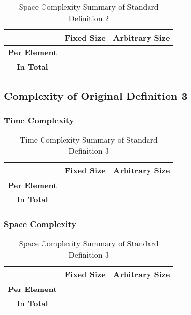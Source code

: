 \documentclass[conference]{IEEEtran}
\begin{document}
\begin{table}[H]
    \centering
    \caption{Space Complexity Summary of Standard Definition 2}
    \begin{tabular}{|c|c|c|}
        \hline
        & \textbf{Fixed Size} & \textbf{Arbitrary Size} \\
        \hline
        \textbf{Per Element} &  &  \\
        \hline
        \textbf{In Total} &  &  \\
        \hline
    \end{tabular}
    \label{tab:space_p2_d02}
\end{table}

\subsection{Complexity of Original Definition 3}
\label{ca:p2_d03}

\subsubsection{Time Complexity}

\begin{table}[H]
    \centering
    \caption{Time Complexity Summary of Standard Definition 3}
    \begin{tabular}{|c|c|c|}
        \hline
        & \textbf{Fixed Size} & \textbf{Arbitrary Size} \\
        \hline
        \textbf{Per Element} &  &  \\
        \hline
        \textbf{In Total} &  &  \\
        \hline
    \end{tabular}
    \label{tab:time_p2_d03}
\end{table}

\subsubsection{Space Complexity}

\begin{table}[H]
    \centering
    \caption{Space Complexity Summary of Standard Definition 3}
    \begin{tabular}{|c|c|c|}
        \hline
        & \textbf{Fixed Size} & \textbf{Arbitrary Size} \\
        \hline
        \textbf{Per Element} &  &  \\
        \hline
        \textbf{In Total} &  &  \\
        \hline
    \end{tabular}
    \label{tab:space_p2_d03}
\end{table}
\end{document}
